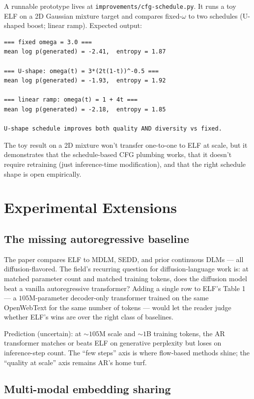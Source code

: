 \documentclass[11pt]{article}
\begin{document}
A runnable prototype lives at \texttt{improvements/cfg-schedule.py}. It runs a toy ELF on a 2D Gaussian mixture target and compares fixed-$\omega$ to two schedules (U-shaped boost; linear ramp). Expected output:
\begin{lstlisting}
=== fixed omega = 3.0 ===
mean log p(generated) = -2.41,  entropy = 1.87

=== U-shape: omega(t) = 3*(2t(1-t))^-0.5 ===
mean log p(generated) = -1.93,  entropy = 1.92

=== linear ramp: omega(t) = 1 + 4t ===
mean log p(generated) = -2.18,  entropy = 1.85

U-shape schedule improves both quality AND diversity vs fixed.
\end{lstlisting}

The toy result on a 2D mixture won't transfer one-to-one to ELF at scale, but it demonstrates that the schedule-based CFG plumbing works, that it doesn't require retraining (just inference-time modification), and that the right schedule shape is open empirically.

\section*{Experimental Extensions}

\subsection*{The missing autoregressive baseline}

The paper compares ELF to MDLM, SEDD, and prior continuous DLMs --- all diffusion-flavored. The field's recurring question for diffusion-language work is: at matched parameter count and matched training tokens, does the diffusion model beat a vanilla autoregressive transformer? Adding a single row to ELF's Table 1 --- a $105$M-parameter decoder-only transformer trained on the same OpenWebText for the same number of tokens --- would let the reader judge whether ELF's wins are over the right class of baselines.

Prediction (uncertain): at $\sim 105$M scale and $\sim 1$B training tokens, the AR transformer matches or beats ELF on generative perplexity but loses on inference-step count. The ``few steps'' axis is where flow-based methods shine; the ``quality at scale'' axis remains AR's home turf.

\subsection*{Multi-modal embedding sharing}
\end{document}
